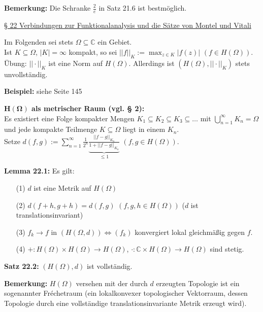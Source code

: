 \documentclass[11pt]{article}
\newcommand{\C}{\mathbb{C}}
\begin{document}
\textbf{Bemerkung:} Die Schranke $\frac{2}{e}$ in Satz 21.6 ist bestmöglich. 

\underline{§ 22 Verbindungen zur Funktionalanalysis und die Sätze von Montel und Vitali}

Im Folgenden sei stets $\Omega \subseteq \C$ ein Gebiet. \\
Ist $K \subseteq \Omega$, $|K| = \infty$ kompakt, so sei $||f||_K := \max_{z \in K} |f(z)|$ $(f \in H(\Omega))$. \\
Übung: $||\cdot||_K$ ist eine Norm auf $H(\Omega)$. Allerdings ist $(H(\Omega), ||\cdot||_K)$ stets unvollständig. 

\textbf{Beispiel:} siehe Seite 145

\textbf{$\boldsymbol{H(\Omega)}$ als metrischer Raum (vgl. § 2):} \\
Es existiert eine Folge kompakter Mengen $K_1 \subseteq K_2 \subseteq K_3 \subseteq \dots $ mit $\bigcup_{n=1}^\infty K_n = \Omega$ und jede kompakte Teilmenge $K \subseteq \Omega$ liegt in einem $K_n$. \\
Setze $d(f,g) := \sum_{n=1}^\infty \frac{1}{2^n} \underbrace{\frac{||f-g||_{K_n}}{1+||f-g||_{K_n}}}_{\leq 1}$ $(f,g \in H(\Omega))$.

\textbf{Lemma 22.1:} Es gilt:
\vspace{-0.6cm}
\begin{itemize}
\item[(1)] $d$ ist eine Metrik auf $H(\Omega)$ \vspace{-0.2cm}
\item[(2)] $d(f+h,g+h) = d(f,g)$ $(f,g,h \in H(\Omega))$ ($d$ ist translationsinvariant) \vspace{-0.2cm}
\item[(3)] $f_k \to f$ in $(H(\Omega,d)) \Leftrightarrow (f_k)$ konvergiert lokal gleichmäßig gegen $f$. \vspace{-0.2cm}
\item[(4)] $+\colon H(\Omega) \times H(\Omega) \to H(\Omega)$, $\cdot \colon \C \times H(\Omega) \to H(\Omega)$ sind stetig.
\end{itemize}
\vspace{-0.3cm}

\textbf{Satz 22.2:} $(H(\Omega),d)$ ist vollständig.

\textbf{Bemerkung:} $H(\Omega)$ versehen mit der durch $d$ erzeugten Topologie ist ein sogenannter Fréchetraum (ein lokalkonvexer topologischer Vektorraum, dessen Topologie durch eine vollständige translationsinvariante Metrik erzeugt wird).
\end{document}
